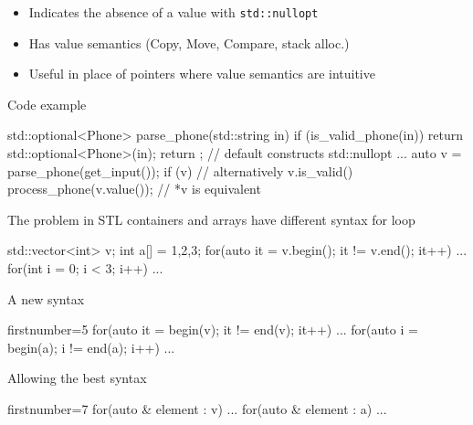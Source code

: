 \begin{frame}[fragile]
  \begin{itemize}
  \item Indicates the absence of a value with \texttt{std::nullopt}
  \item Has value semantics (Copy, Move, Compare, stack alloc.)
  \item Useful in place of pointers where value semantics are intuitive
  \end{itemize}
  \begin{exampleblock}{Code example}
    \begin{cppcode*}{}
      std::optional<Phone> parse_phone(std::string in)
      {
        if (is_valid_phone(in)) {
          return std::optional<Phone>(in);
        }
        return {}; // default constructs std::nullopt
      }
      ...
      auto v = parse_phone(get_input());
      if (v) {  // alternatively v.is_valid()
        process_phone(v.value()); // *v is equivalent
      }
    \end{cppcode*}
  \end{exampleblock}
\end{frame}

\begin{frame}[fragile]
  \begin{alertblock}{The problem in }
    STL containers and arrays have different syntax for loop
    \vspace{-1mm}
    \begin{cppcode*}{}
      std::vector<int> v;
      int a[] = {1,2,3};
      for(auto it = v.begin(); it != v.end(); it++) {...}
      for(int i = 0; i < 3; i++) {...}
    \end{cppcode*}
  \end{alertblock}
  \pause
  \begin{block}{A new syntax}
    \begin{cppcode*}{firstnumber=5}
      for(auto it = begin(v); it != end(v); it++) {...}
      for(auto i = begin(a); i != end(a); i++) {...}
    \end{cppcode*}
  \end{block}
  \pause
  \begin{exampleblock}{Allowing the best syntax}
    \begin{cppcode*}{firstnumber=7}
      for(auto & element : v) {...}
      for(auto & element : a) {...}
    \end{cppcode*}
  \end{exampleblock}
\end{frame}

